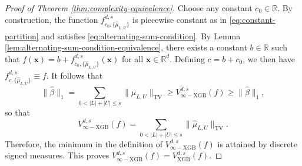 \documentclass[10pt]{article}
\newcommand{\R}{{\mathbb R}}
\newcommand{\vxgb}{{V^{d, s}_{\text{XGB}}}}
\newcommand{\vinfxgb}{{V^{d, s}_{\infty-\text{XGB}}}}
\newcommand{\xbf}{{\mathbf{x}}}
\begin{document}
\begin{proof}[Proof of Theorem \ref{thm:complexity-equivalence}]
Choose any constant $c_0 \in \R$. By construction, the function
$f^{d, s}_{c_0, \{\hat{\mu}_{L, U}\}}$ is piecewise constant as 
in \eqref{eq:constant-partition} and satisfies 
\eqref{eq:alternating-sum-condition}. By Lemma 
\ref{lem:alternating-sum-condition-equivalence}, there exists a constant 
$b \in \R$ such that $f(\xbf) = b + f^{d, s}_{c_0, \{\hat{\mu}_{L, U}\}}(\xbf)$ 
for all $\xbf \in \R^d$. Defining $c = b + c_0$, 
we then have $f^{d, s}_{c, \{\hat{\mu}_{L, U}\}} \equiv f$. 
It follows that
\begin{equation*}
    \|\hat{\beta}\|_1 = \sum_{0 < |L| + |U| \le s} 
    \|\hat{\mu}_{L, U}\|_{\text{TV}} 
    \ge \vinfxgb(f) 
    \ge \|\hat{\beta}\|_1,
\end{equation*}
so that 
\begin{equation*}
    \vinfxgb(f) = \sum_{0 < |L| + |U| \le s} 
    \|\hat{\mu}_{L, U}\|_{\text{TV}}. 
\end{equation*}
Therefore, the minimum in the definition of $\vinfxgb(f)$ is attained by discrete 
signed measures. This proves $\vinfxgb(f) = \vxgb(f)$.
\end{proof}
    
\end{document}
